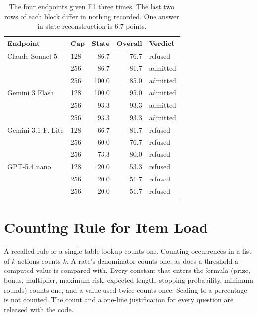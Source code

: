 \documentclass[11pt]{article}
\begin{document}
\begin{table}[h]
  \centering
  \small
  \setlength{\tabcolsep}{3pt}
  \begin{tabular}{@{}llrrl@{}}
    \toprule
    Endpoint & Cap & State & Overall & Verdict \\
    \midrule
    Claude Sonnet 5 & 128 &  86.7 & 76.7 & refused \\
                    & 256 &  86.7 & 81.7 & admitted \\
                    & 256 & 100.0 & 85.0 & admitted \\
    Gemini 3 Flash  & 128 & 100.0 & 95.0 & admitted \\
                    & 256 &  93.3 & 93.3 & admitted \\
                    & 256 &  93.3 & 93.3 & admitted \\
    Gemini 3.1 F.-Lite & 128 &  66.7 & 81.7 & refused \\
                    & 256 &  60.0 & 76.7 & refused \\
                    & 256 &  73.3 & 80.0 & refused \\
    GPT-5.4 nano    & 128 &  20.0 & 53.3 & refused \\
                    & 256 &  20.0 & 51.7 & refused \\
                    & 256 &  20.0 & 51.7 & refused \\
    \bottomrule
  \end{tabular}
  \caption{The four endpoints given F1 three times. The last two rows of each
  block differ in nothing recorded. One answer in state reconstruction is 6.7
  points.}
\end{table}

\section{Counting Rule for Item Load}
\label{sec:app-items}

A recalled rule or a single table lookup counts one. Counting occurrences in a
list of $k$ actions counts $k$. A rate's denominator counts one, as does a
threshold a computed value is compared with. Every constant that enters the
formula (prize, bonus, multiplier, maximum risk, expected length, stopping
probability, minimum rounds) counts one, and a value used twice counts once.
Scaling to a percentage is not counted. The count and a one-line justification
for every question are released with the code.
\end{document}
